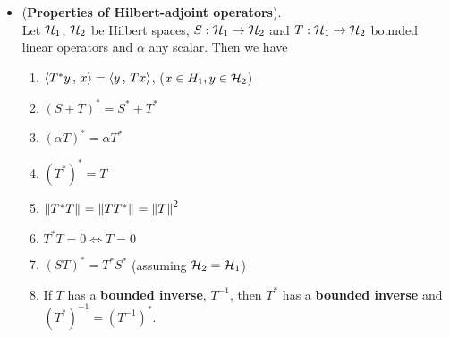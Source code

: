 \documentclass[11pt]{article}
\begin{document}
\begin{itemize}
\item \begin{proposition} (\textbf{Properties of Hilbert-adjoint operators}).  \citep{reed1980methods, kreyszig1989introductory}\\
Let ${\mathcal H}_1$, ${\mathcal H}_2$ be Hilbert spaces, $S: {\mathcal H}_1 \rightarrow {\mathcal H}_2$ and $T: {\mathcal H}_1 \rightarrow {\mathcal H}_2$ bounded linear operators and $\alpha$ any scalar. Then we have
\begin{enumerate}
\item $\left\langle T^{*}y\,,\, x \right\rangle = \left\langle y\,,\, Tx \right\rangle$,  ($x \in H_1,  y \in {\mathcal H}_2$)
\item $ (S + T)^{*} = S^{*} + T^{*}$
\item $(\alpha T)^{*} = \alpha T^{*}$
\item $(T^{*})^{*} = T$
\item $\left\|T^{*}T\right\|_{} = \left\|TT^{*}\right\|_{} = \left\|T\right\|_{}^2$
\item $T^{*}T =0 \Leftrightarrow T=0$
\item $(ST)^{*}= T^{*}S^{*}$  (assuming ${\mathcal H}_2 = {\mathcal H}_1$)
\item If $T$ has a \textbf{bounded inverse},  $T^{-1}$, then $T^*$ has a \textbf{bounded inverse} and $(T^{*})^{-1} = (T^{-1})^{*}$.
\end{enumerate}
\end{proposition}
\end{itemize}
\end{document}

